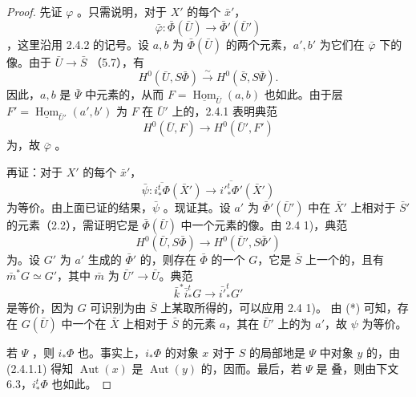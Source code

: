 \begin{proof}
先证 $\varphi$ 。只需说明，对于 $X'$ 的每个 $\bar x'$，
\[\bar\varphi:\bar\Phi(\bar U)\longrightarrow\bar\Phi'(\bar U')\]
，这里沿用 2.4.2 的记号。设 $a,b$ 为 $\bar\Phi(\bar U)$ 的两个元素，$a',b'$ 为它们在 $\bar\varphi$ 下的像。由于 $\bar U\to\bar S$ （5.7），有
\[H^0(\bar U,S\bar\Phi)\xrightarrow{\sim}H^0(\bar S,S\bar\Psi).\]
因此，$a,b$ 是 $\bar\Psi$ 中元素的，从而 $F=\underline{\operatorname{Hom}}_{\bar U}(a,b)$ 也如此。由于层 $F'=\underline{\operatorname{Hom}}_{\bar U'}(a',b')$ 为 $F$ 在 $\bar U'$ 上的，2.4.1 表明典范
\[H^0(\bar U,F)\longrightarrow H^0(\bar U',F')\]
为，故 $\bar\varphi$ 。

再证：对于 $X'$ 的每个 $\bar x'$，
\[\bar\psi:\overline{i_*^t\Phi}(\bar X')\longrightarrow\overline{{i'}_*^t\Phi'}(\bar X')\]
为等价。由上面已证的结果，$\bar\psi$ 。现证其。设 $a'$ 为 $\bar\Phi'(\bar U')$ 中在 $\bar X'$ 上相对于 $\bar S'$ 的元素（2.2），需证明它是 $\bar\Phi(\bar U)$ 中一个元素的像。由 2.4 1)，典范
\[H^0(\bar U,S\bar\Phi)\longrightarrow H^0(\bar U',S\bar\Phi')\]
为。设 $G'$ 为 $a'$ 生成的 $\bar\Phi'$ 的，则存在 $\bar\Phi$ 的一个 $G$，它是 $\bar S$ 上一个的，且有 $\bar m^*G\simeq G'$，其中 $\bar m$ 为 $\bar U'\to\bar U$。典范
\[\bar k^*\bar i_*^tG\longrightarrow\bar {i'}_*^tG'\tag{*}\]
是等价，因为 $G$ 可识别为由 $\bar S$ 上某取所得的，可以应用 2.4 1)。
由 (*) 可知，存在 $G(\bar U)$ 中一个在 $\bar X$ 上相对于 $\bar S$ 的元素 $a$，其在 $\bar U'$ 上的为 $a'$，故 $\psi$ 为等价。

若 $\Psi$ ，则 $i_*\Phi$ 也。事实上，$i_*\Phi$ 的对象 $x$ 对于 $S$ 的局部地是 $\Psi$ 中对象 $y$ 的，由 (2.4.1.1) 得知 $\operatorname{Aut}(x)$ 是 $\operatorname{Aut}(y)$ 的，因而。最后，若 $\Psi$ 是 叠，则由下文 6.3，$i_*^t\Phi$ 也如此。
\end{proof}

